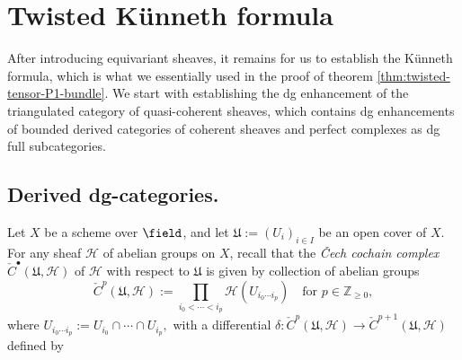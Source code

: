 \section{Twisted Künneth formula\label{sec:kunneth-formula}}
After introducing equivariant sheaves, it remains for us to establish the Künneth formula, which is what we essentially used in the proof of theorem \ref{thm:twisted-tensor-P1-bundle}. We start with establishing the dg enhancement of the triangulated category of quasi-coherent sheaves, which contains dg enhancements of bounded derived categories of coherent sheaves and perfect complexes as dg full subcategories.
\subsection{Derived dg-categories.}
Let $X$ be a scheme over $\field$, and let 
$\mathfrak{U}:=(U_i)_{i\in I}$
be an open cover of $X$.
For any sheaf $\mathcal{H}$
of abelian groups
on $X$,
recall that
the \emph{\v{C}ech cochain complex}
$
\check{C}^{\bullet}(\mathfrak{U},\mathcal{H})
$
of $\mathcal{H}$
with respect to $\mathfrak{U}$ is given by
collection of
abelian groups
$$
\check{C}^p(\mathfrak{U},\mathcal{H})
:=
\prod_{i_0<\cdots<i_p}
\mathcal{H}\left(U_{i_0\cdots i_p}\right)
\quad\text{for }
p\in\mathbb{Z}_{\ge0},
$$
where
$
U_{i_0\cdots i_p}
:=
U_{i_0}\cap\cdots\cap U_{i_p},
$
with a differential
$
\delta:
\check{C}^p(\mathfrak{U},\mathcal{H})
\rightarrow
\check{C}^{p+1}(\mathfrak{U},\mathcal{H})
$
defined by
